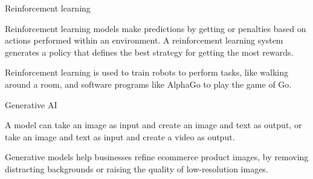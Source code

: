 \begin{frame}{Reinforcement learning}
  \begin{withmargin}
    \begin{tdmain}
      Reinforcement learning models make predictions by getting 
      or penalties based on actions performed within an environment. A
      reinforcement learning system generates a policy that defines the best
      strategy for getting the most rewards.
    \end{tdmain}
    \begin{tdmargin}
      Reinforcement learning is used to train robots to perform tasks, like
      walking around a room, and software programs like AlphaGo to play the game
      of Go.
    \end{tdmargin}
  \end{withmargin}
\end{frame}

\begin{frame}{Generative AI}
  \begin{withmargin}
    \begin{tdmargin}
      A model can take an image as input and create an image and text as output,
      or take an image and text as input and create a video as output.
      \par\medskip
      Generative models help businesses refine ecommerce product images, by
      removing distracting backgrounds or raising the quality of low-resolution
      images.
    \end{tdmargin}
  \end{withmargin}
\end{frame}

